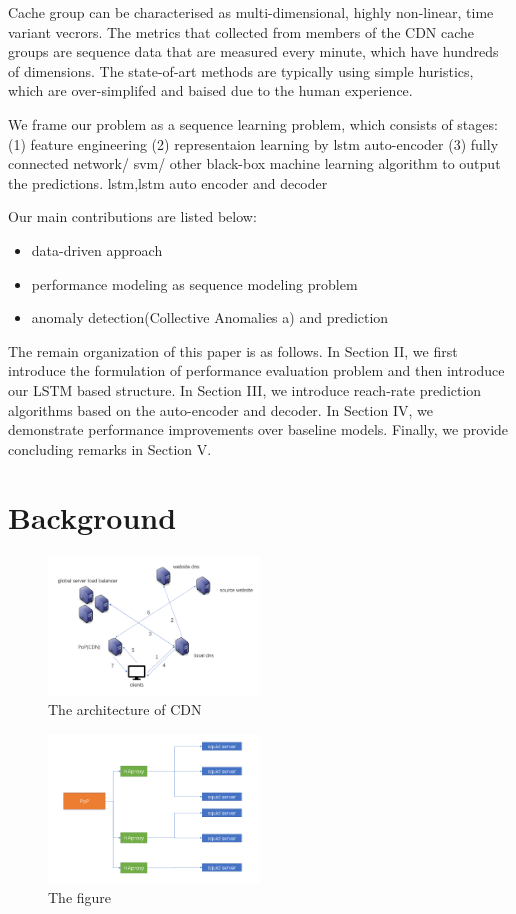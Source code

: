 \documentclass[5p]{elsarticle}
\begin{document}
Cache group can be characterised as multi-dimensional, highly non-linear, time variant vecrors. The metrics that collected from members of the CDN cache groups are sequence data that are measured every minute, which have hundreds of dimensions. The state-of-art methods are typically using simple huristics, which are over-simplifed and baised due to the human experience. 

We frame our problem as a sequence learning problem, which consists of stages: (1) feature engineering (2) representaion learning by lstm auto-encoder (3) fully connected network/ svm/ other black-box machine learning algorithm to output the predictions. 
lstm,lstm auto encoder and decoder

Our main contributions are listed below:
\begin{itemize}
  \item data-driven approach
  \item performance modeling as sequence modeling problem
  \item anomaly detection(Collective Anomalies a) and prediction
\end{itemize}

The remain organization of this paper is as follows. In Section II, we first  introduce the formulation of performance evaluation problem and  then introduce  our LSTM  based  structure. In Section III, we introduce reach-rate prediction algorithms based on the
auto-encoder and decoder. In Section IV, we demonstrate performance  improvements over baseline models. Finally, we provide concluding remarks in Section V.
\section{Background}
\begin{figure}[h]
    \centering
    \includegraphics[width=0.5\textwidth]{CDN_new.png}
    \caption{The architecture of CDN}
    \label{fig}
\end{figure}

\begin{figure}[h]
    \centering
    \includegraphics[width=0.5\textwidth]{cache_group.png}
    \caption{The figure}
    \label{fig: the structure of PoP}
\end{figure}
\end{document}
